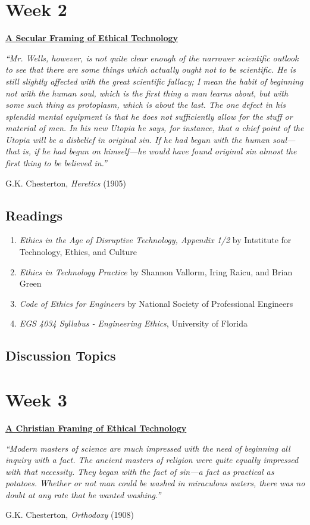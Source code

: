 \documentclass[11pt]{article}
\let\oldsection\section
\renewcommand\section{\clearpage\oldsection}
\begin{document}
\section*{Week 2}
\label{sec:orge522f5a}
\begin{center}
\large \textbf{\uline{A Secular Framing of Ethical Technology}}
\end{center}
\begin{mdframed}
\emph{``Mr. Wells, however, is not quite clear enough of the narrower scientific outlook
to see that there are some things which actually ought not to be scientific. He
is still slightly affected with the great scientific fallacy; I mean the habit
of beginning not with the human soul, which is the first thing a man learns
about, but with some such thing as protoplasm, which is about the last. The one
defect in his splendid mental equipment is that he does not sufficiently allow
for the stuff or material of men. In his new Utopia he says, for instance, that
a chief point of the Utopia will be a disbelief in original sin. If he had begun
with the human soul—that is, if he had begun on himself—he would have found
original sin almost the first thing to be believed in.''}

\hfill G.K. Chesterton, \emph{Heretics} (1905)
\end{mdframed}
\subsection*{Readings}
\label{sec:orga535a36}
\begin{enumerate}
\item \emph{Ethics in the Age of Disruptive Technology, Appendix 1/2} by Intstitute for
Technology, Ethics, and Culture
\item \emph{Ethics in Technology Practice} by Shannon Vallorm, Iring Raicu, and Brian
Green
\item \emph{Code of Ethics for Engineers} by National Society of Professional Engineers
\item \emph{EGS 4034 Syllabus - Engineering Ethics}, University of Florida
\end{enumerate}
\subsection*{Discussion Topics}
\label{sec:org947099d}
\section*{Week 3}
\label{sec:orgdfd113a}
\begin{center}
\large \textbf{\uline{A Christian Framing of Ethical Technology}}
\end{center}
\begin{mdframed}
\emph{``Modern masters of science are much impressed with the need of beginning all
inquiry with a fact. The ancient masters of religion were quite equally
impressed with that necessity. They began with the fact of sin—a fact as
practical as potatoes. Whether or not man could be washed in miraculous waters,
there was no doubt at any rate that he wanted washing.''}

\hfill G.K. Chesterton, \emph{Orthodoxy} (1908)
\end{mdframed}
\end{document}
